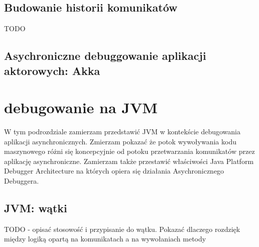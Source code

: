 \subsection{Budowanie historii komunikatów}

TODO

\subsection{Asychroniczne debuggowanie aplikacji aktorowych: Akka}

\section{debugowanie na JVM}

W tym podrozdziale zamierzam przedstawić JVM w kontekście debugowania aplikacji asynchronicznych. Zmierzam pokazać że potok wywoływania kodu maszynowego różni się koncepcyjnie od potoku przetwarzania komunikatów przez aplikację asynchroniczne. Zamierzam także przestawić właściwości Java Platform Debugger Architecture na których opiera się działania Asychronicznego Debuggera.

\subsection{JVM: wątki}

TODO - opisać stosowość i przypisanie do wątku. Pokazać dlaczego rozdzięk między logiką opartą na komunikatach a na wywołaniach metody

